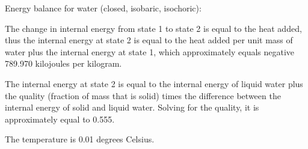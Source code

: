 Energy balance for water (closed, isobaric, isochoric):

The change in internal energy from state 1 to state 2 is equal to the heat added, thus the internal energy at state 2 is equal to the heat added per unit mass of water plus the internal energy at state 1, which approximately equals negative 789.970 kilojoules per kilogram.

The internal energy at state 2 is equal to the internal energy of liquid water plus the quality (fraction of mass that is solid) times the difference between the internal energy of solid and liquid water. Solving for the quality, it is approximately equal to 0.555.

The temperature is 0.01 degrees Celsius.